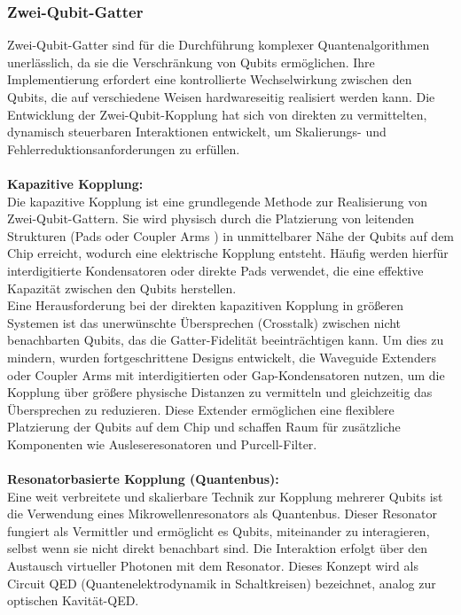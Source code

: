 \subsubsection{Zwei-Qubit-Gatter}
Zwei-Qubit-Gatter sind für die Durchführung komplexer Quantenalgorithmen unerlässlich, da sie die Verschränkung von Qubits ermöglichen. Ihre Implementierung erfordert eine kontrollierte Wechselwirkung zwischen den Qubits, die auf verschiedene Weisen hardwareseitig realisiert werden kann. Die Entwicklung der Zwei-Qubit-Kopplung hat sich von direkten zu vermittelten, dynamisch steuerbaren Interaktionen entwickelt, um Skalierungs- und Fehlerreduktionsanforderungen zu erfüllen.\\\\
\textbf{Kapazitive Kopplung:}\\
Die kapazitive Kopplung ist eine grundlegende Methode zur Realisierung von Zwei-Qubit-Gattern. Sie wird physisch durch die Platzierung von leitenden Strukturen (Pads oder \grqq{}Coupler Arms\grqq{} ) in unmittelbarer Nähe der Qubits auf dem Chip erreicht, wodurch eine elektrische Kopplung entsteht. Häufig werden hierfür interdigitierte Kondensatoren oder direkte Pads verwendet, die eine effektive Kapazität zwischen den Qubits herstellen.\\
Eine Herausforderung bei der direkten kapazitiven Kopplung in größeren Systemen ist das unerwünschte Übersprechen (Crosstalk) zwischen nicht benachbarten Qubits, das die Gatter-Fidelität beeinträchtigen kann. Um dies zu mindern, wurden fortgeschrittene Designs entwickelt, die \grqq{}Waveguide Extenders\grqq{} oder \grqq{}Coupler Arms\grqq{} mit interdigitierten oder Gap-Kondensatoren nutzen, um die Kopplung über größere physische Distanzen zu vermitteln und gleichzeitig das Übersprechen zu reduzieren. Diese Extender ermöglichen eine flexiblere Platzierung der Qubits auf dem Chip und schaffen Raum für zusätzliche Komponenten wie Ausleseresonatoren und Purcell-Filter.
\\\\
\textbf{Resonatorbasierte Kopplung (Quantenbus):}\\
Eine weit verbreitete und skalierbare Technik zur Kopplung mehrerer Qubits ist die Verwendung eines Mikrowellenresonators als \grqq Quantenbus\grqq{}. Dieser Resonator fungiert als Vermittler und ermöglicht es Qubits, miteinander zu interagieren, selbst wenn sie nicht direkt benachbart sind. Die Interaktion erfolgt über den Austausch virtueller Photonen mit dem Resonator. Dieses Konzept wird als \grqq Circuit QED\grqq{} (Quantenelektrodynamik in Schaltkreisen) bezeichnet, analog zur optischen Kavität-QED.\\
